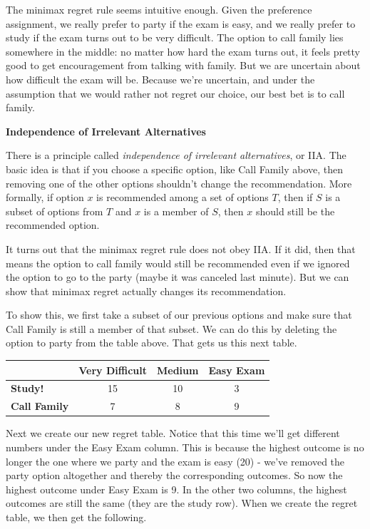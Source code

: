 \documentclass[]{tufte-book}
\begin{document}
The minimax regret rule seems intuitive enough. Given the preference assignment, we really prefer to party if the exam is easy, and we really prefer to study if the exam turns out to be very difficult. The option to call family lies somewhere in the middle: no matter how hard the exam turns out, it feels pretty good to get encouragement from talking with family. But we are uncertain about how difficult the exam will be. Because we're uncertain, and under the assumption that we would rather not regret our choice, our best bet is to call family.

\textbf{Independence of Irrelevant Alternatives}

There is a principle called \emph{independence of irrelevant alternatives}, or IIA. The basic idea is that if you choose a specific option, like Call Family above, then removing one of the other options shouldn't change the recommendation. More formally, if option \(x\) is recommended among a set of options \(T\), then if \(S\) is a subset of options from \(T\) and \(x\) is a member of \(S\), then \(x\) should still be the recommended option.

It turns out that the minimax regret rule does not obey IIA. If it did, then that means the option to call family would still be recommended even if we ignored the option to go to the party (maybe it was canceled last minute). But we can show that minimax regret actually changes its recommendation.

To show this, we first take a subset of our previous options and make sure that Call Family is still a member of that subset. We can do this by deleting the option to party from the table above. That gets us this next table.

\begin{longtable}[]{@{}lccc@{}}
\toprule
& Very Difficult & Medium & Easy Exam\tabularnewline
\midrule
\endhead
\textbf{Study!} & 15 & 10 & 3\tabularnewline
\textbf{Call Family} & 7 & 8 & 9\tabularnewline
\bottomrule
\end{longtable}

Next we create our new regret table. Notice that this time we'll get different numbers under the Easy Exam column. This is because the highest outcome is no longer the one where we party and the exam is easy (20) - we've removed the party option altogether and thereby the corresponding outcomes. So now the highest outcome under Easy Exam is 9. In the other two columns, the highest outcomes are still the same (they are the study row). When we create the regret table, we then get the following.
\end{document}
